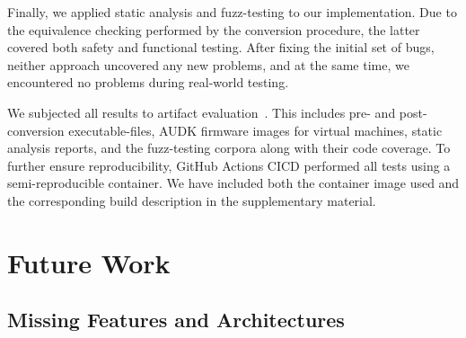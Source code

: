 Finally, we applied static analysis and \gls{fuzz-testing} to our implementation. Due to the equivalence checking performed by the conversion procedure, the latter covered both safety and functional testing. After fixing the initial set of bugs, neither approach uncovered any new problems, and at the same time, we encountered no problems during real-world testing.

We subjected all results to artifact evaluation~\cite{thesis-git}. This includes pre- and post-conversion \glspl{executable-file}, \gls{AUDK} \gls{firmware} images for virtual machines, static analysis reports, and the \gls{fuzz-testing} corpora along with their code coverage. To further ensure reproducibility, GitHub Actions \gls{CICD} performed all tests using a semi-reproducible container. We have included both the container image used and the corresponding build description in the supplementary material.

\chapter{Future Work}
\label{chap:future_work}

\section{Missing Features and Architectures}

